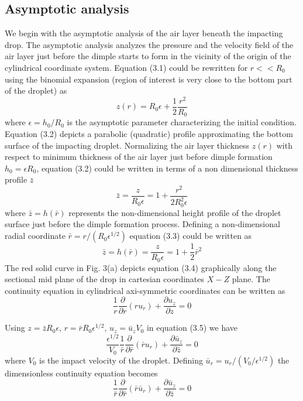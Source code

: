 \documentclass{jfm}
\begin{document}
\subsection{Asymptotic analysis}
We begin with the asymptotic analysis of the air layer beneath the impacting drop. 
The asymptotic analysis analyzes the pressure and the velocity field of the air layer just before the dimple starts to form in the vicinity of the origin of the cylindrical coordinate system.
Equation (3.1) could be rewritten for $r<<R_0$ using the binomial expansion (region of interest is very close to the bottom part of the droplet) as
\begin{equation}
    z(r) = R_0{\epsilon} + \frac{1}{2}\frac{r^2}{R_0}
\end{equation}
where ${\epsilon}=h_0/R_0$
is the asymptotic parameter characterizing the initial condition. Equation (3.2) depicts a parabolic (quadratic) profile approximating the bottom surface of the impacting droplet. Normalizing the air layer thickness $z(r)$ with respect to minimum thickness of the air layer just before dimple formation $h_0={\epsilon}R_0$, equation (3.2) could be written in terms of a non dimensional thickness profile $\bar{z}$
\begin{equation}
    \bar{z}=\frac{z}{R_0{\epsilon}}=1+\frac{r^2}{2R_0^2{\epsilon}}
\end{equation}
where $\bar{z}=h(\bar{r})$ represents the non-dimensional height profile of the droplet surface just before the dimple formation process.
Defining a non-dimensional radial coordinate $\bar{r}=r/(R_0{\epsilon}^{1/2})$ equation (3.3) could be written as
\begin{equation}
    \bar{z}=h(\bar{r})=\frac{z}{R_0{\epsilon}}=1+\frac{1}{2}\bar{r}^2
\end{equation}
The red solid curve in Fig. 3(a) depicts equation (3.4) graphically along the sectional mid plane of the drop in cartesian coordinates $X-Z$ plane.  
The continuity equation in cylindrical axi-symmetric coordinates can be written as
\begin{equation}
    \frac{1}{r}\frac{\partial}{{\partial}r}\left(ru_r\right)+\frac{{\partial}u_z}{{\partial}z} = 0
    \label{e16}
\end{equation}

Using $z=\bar{z}R_0{\epsilon}$, ${r}=\bar{r}R_0{\epsilon}^{1/2}$, $u_z=\bar{u}_zV_0$ in equation (3.5) we have
\begin{equation}
    \frac{{\epsilon}^{1/2}}{V_0}\frac{1}{\bar{r}}\frac{\partial}{{\partial}\bar{r}}\left(\bar{r}{u}_r\right)+\frac{{\partial}\bar{u}_z}{{\partial}\bar{z}} = 0
\end{equation}
where $V_0$ is the impact velocity of the droplet.
Defining $\bar{u}_r=u_r/(V_0/{\epsilon}^{1/2})$ the dimensionless continuity equation becomes 
\begin{equation}
  \frac{1}{\bar{r}}\frac{\partial}{{\partial}\bar{r}}\left(\bar{r}\bar{u}_r\right)+\frac{{\partial}\bar{u}_z}{{\partial}\bar{z}} = 0
\end{equation}
\end{document}
